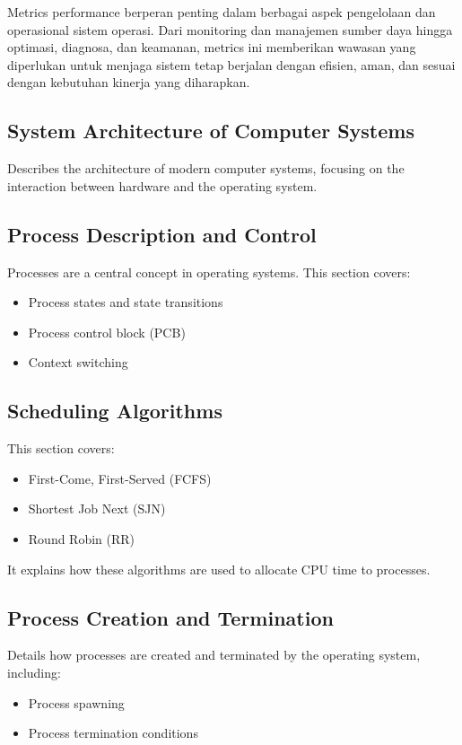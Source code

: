 \documentclass[12pt]{article}
\begin{document}
\hspace*{1cm} Metrics performance berperan penting dalam berbagai aspek pengelolaan dan operasional sistem operasi. Dari monitoring dan manajemen sumber daya hingga optimasi, diagnosa, dan keamanan, metrics ini memberikan wawasan yang diperlukan untuk menjaga sistem tetap berjalan dengan efisien, aman, dan sesuai dengan kebutuhan kinerja yang diharapkan.

\subsection{System Architecture of Computer Systems}
Describes the architecture of modern computer systems, focusing on the interaction between hardware and the operating system.

\subsection{Process Description and Control}
Processes are a central concept in operating systems. This section covers:
\begin{itemize}
    \item Process states and state transitions
    \item Process control block (PCB)
    \item Context switching
\end{itemize}

\subsection{Scheduling Algorithms}
This section covers:
\begin{itemize}
    \item First-Come, First-Served (FCFS)
    \item Shortest Job Next (SJN)
    \item Round Robin (RR)
\end{itemize}
It explains how these algorithms are used to allocate CPU time to processes.

\subsection{Process Creation and Termination}
Details how processes are created and terminated by the operating system, including:
\begin{itemize}
    \item Process spawning
    \item Process termination conditions
\end{itemize}
\end{document}
